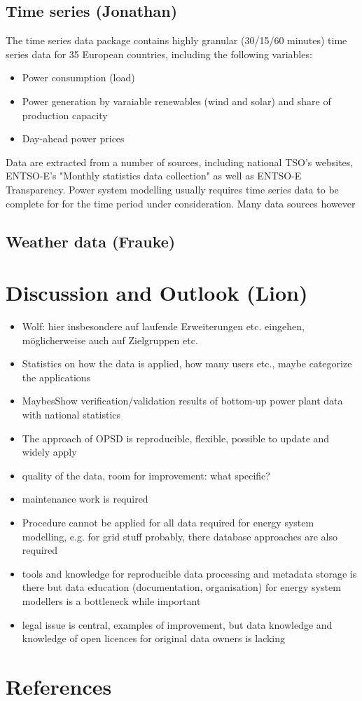 \documentclass[article]{elsarticle}
\begin{document}
\subsection{Time series (Jonathan)}
The time series data package contains highly granular (30/15/60 minutes) time series data for 35 European countries, including the following variables:
\begin{itemize}
    \item Power consumption (load)
    \item Power generation by varaiable renewables (wind and solar) and share of production capacity 
    \item Day-ahead power prices
\end{itemize}
Data are extracted from a number of sources, including national TSO's websites, ENTSO-E's "Monthly statistics data collection" as well as ENTSO-E Transparency.
Power system modelling usually requires time series data to be complete for for the time period under consideration. Many data sources however 


\subsection{Weather data (Frauke)}
        
\section{Discussion and Outlook (Lion)}
\begin{itemize}
    \item Wolf: hier insbesondere auf laufende Erweiterungen etc. eingehen, möglicherweise auch auf Zielgruppen etc. 
    \item Statistics on how the data is applied, how many users etc., maybe categorize the applications
    \item MaybesShow verification/validation results of bottom-up power plant data with national statistics
    \item The approach of OPSD is reproducible, flexible, possible to update and widely apply
    \item quality of the data, room for improvement: what specific?
    \item maintenance work is required
    \item Procedure cannot be applied for all data required for energy system modelling, e.g. for grid stuff probably, there database approaches are also required
    \item tools and knowledge for reproducible data processing and metadata storage is there but data education (documentation, organisation) for energy system modellers is a bottleneck while important
    \item legal issue is central, examples of improvement, but data knowledge and knowledge of open licences for original data owners is lacking
\end{itemize}

\section*{References}


\end{document}
